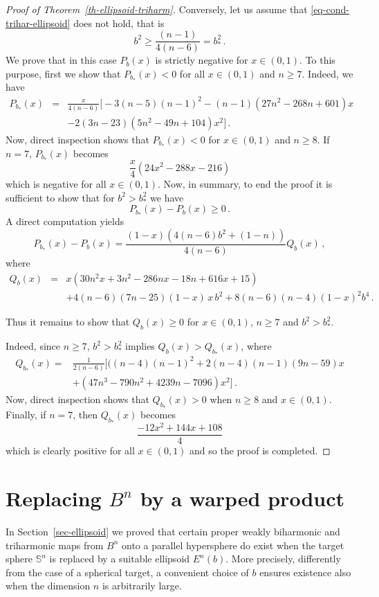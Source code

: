 \documentclass[11pt]{amsart}
\theoremstyle{plain}
\theoremstyle{definition}
\numberwithin{equation}{section}
\def \s{{\mathbb S}}
\numberwithin{equation}{section}
\begin{document}
\begin{proof}[Proof of Theorem~\ref{th-ellipsoid-triharm}]
Conversely, let us assume that \eqref{eq-cond-trihar-ellipsoid} does not hold, that is
\[
b^2\geq\frac{(n-1)}{4(n-6)}=b_*^2\,.
\]
We prove that in this case $P_{b}(x)$ is strictly negative for $x \in(0,1)$. To this purpose, first we show that $P_{b_*}(x)<0$ for all $x\in (0,1)$ and $n\geq 7$. Indeed, we have 
\begin{eqnarray*}
P_{b_*}(x)&=& \frac{x}{4(n-6)}\Big [-3 (n-5) (n-1)^2-(n-1) \left(27 n^2-268 n+601\right) x\\
&&-2 (3 n-23) \left(5 n^2-49 n+104\right) x^2 \Big ]\,.
\end{eqnarray*}
Now, direct inspection shows that $P_{b_*}(x)<0$ for $x\in (0,1)$ and $n\geq 8$. If $n=7$, $P_{b_*}(x)$ becomes
\[
\frac{x}{4}(24 x^2-288 x-216)
\]
which is negative for all $x\in (0,1)$. Now, in summary, to end the proof it is sufficient to show that for $b^2> b_*^2$ we have
\[
P_{b_*}(x)-P_{b}(x)\geq 0\,.
\]
A direct computation yields
\[
P_{b_*}(x)-P_{b}(x)=\frac{(1-x) (4 (n-6)b^2+(1-n))}{4 (n-6)} Q_b(x)\,,
\]
where
\begin{eqnarray*}
Q_b(x)&=&x \left(30 n^2 x+3 n^2-286 n x-18 n+616 x+15\right)\\
&&+4 (n-6) (7 n-25) (1-x)\, x\, b^2+8 (n-6) (n-4) (1-x)^2 b^4\,.
\end{eqnarray*}

Thus it remains to show that $Q_b(x)\geq 0$ for $x\in (0,1)$, $n\geq 7$ and $b^2> b_*^2$.

Indeed, since $n\geq 7$, $b^2> b_*^2$ implies $Q_b(x)>Q_{b_*}(x)$, where
\[
\begin{split}
Q_{b_*}(x)=&\frac{1}{2(n-6)}\Big[((n-4) (n-1)^2+2 (n-4) (n-1) (9 n-59) x\\
&+\left(47 n^3-790 n^2+4239 n-7096\right) x^2\Big]\,.
\end{split}
\]
Now, direct inspection shows that $Q_{b_*}(x)>0$ when $n\geq 8$ and $x\in (0,1)$. Finally, if $n=7$, then $Q_{b_*}(x)$ becomes
\[
\frac{-12 x^2+144 x+108}{4}
\]
which is clearly positive for all $x\in (0,1)$ and so the proof is completed.
\end{proof}


\section{Replacing $B^n$ by a warped product}\label{sec-domain-not-Bn}
In Section~\ref{sec-ellipsoid} we proved that certain proper weakly biharmonic and triharmonic maps from $B^n$ onto a parallel hypersphere do exist when the target sphere $\s^n$ is replaced by a suitable ellipsoid $E^n(b)$. More precisely, differently from the case of a spherical target, a convenient choice of $b$ ensures existence also when the dimension $n$ is arbitrarily large.
\end{document}
